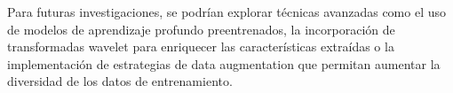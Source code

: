 \documentclass[journal]{IEEEtran}
\begin{document}
Para futuras investigaciones, se podrían explorar técnicas avanzadas como el uso de modelos de aprendizaje profundo preentrenados, la incorporación de transformadas wavelet para enriquecer las características extraídas o la implementación de estrategias de data augmentation que permitan aumentar la diversidad de los datos de entrenamiento.
\ifCLASSOPTIONcaptionsoff
  \newpage
\fi





%
%
%

\end{document}
